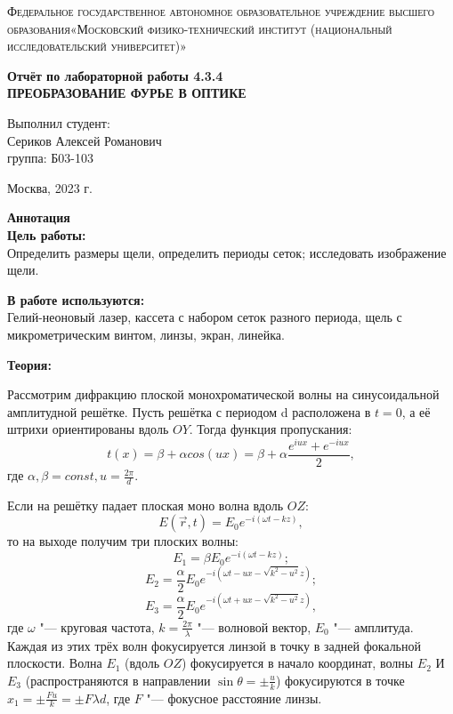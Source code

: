 \documentclass[a4paper, 12pt]{article}%
\begin{document}
	\begin{titlepage}
		\begin{center}
			\textsc{Федеральное государственное автономное образовательное учреждение высшего образования«Московский физико-технический институт (национальный исследовательский университет)»\\[5mm]
			}
			
			\vfill
			
			\textbf{Отчёт по лабораторной работы 4.3.4 \\[3mm]
				ПРЕОБРАЗОВАНИЕ ФУРЬЕ В ОПТИКЕ
				\\[50mm]
			}
			
		\end{center}
		
		\hfill
		\begin{minipage}{.5\textwidth}
			Выполнил студент:\\[2mm]
			Сериков Алексей Романович\\[2mm]
			группа: Б03-103\\[5mm]
			
		\end{minipage}
		\vfill
		\begin{center}
			Москва, 2023 г.
		\end{center}
		
	\end{titlepage}
	
	\newpage
	\textbf{Аннотация}\\
	
	
	\textbf{Цель работы: }\\
	
	Определить размеры щели, определить периоды сеток; исследовать изображение щели.
	
	
	\textbf{В работе используются: }\\
	
	Гелий-неоновый лазер, кассета с набором сеток разного периода, щель с микрометрическим винтом, линзы, экран, линейка.
	
	
		\textbf{Теория:}
	
	Рассмотрим дифракцию плоской монохроматической волны на синусоидальной амплитудной решётке. Пусть решётка с периодом d расположена в $t = 0$, а её штрихи ориентированы вдоль $OY$. Тогда функция пропускания:
	\[
	t(x) = \beta  + \alpha cos(ux) = \beta + \alpha \frac{e^{iux} + e^{-iux}}{2},
	\]
	где $\alpha, \beta = const, u = \frac{2 \pi}{d}$.
	
	Если на решётку падает плоская моно волна вдоль $OZ$:
	\[
	E(\vec r, t) = E_0 e^{-i(\omega t - kz)},
	\]
	то на выходе получим три плоских волны:
	\[
	E_1 = \beta E_0 e^{-i (\omega t - kz)};
	\]
	\[
	E_2 = \frac{\alpha}{2} E_0 e^{-i (\omega t - ux - \sqrt{k^2 - u^2}z)};
	\]
	\[
	E_3 = \frac{\alpha}{2} E_0 e^{-i (\omega t + ux - \sqrt{k^2 - u^2}z)},
	\]
	где $\omega$ "--- круговая частота, $k = \frac{2 \pi}{\lambda}$ "--- волновой вектор, $E_0$ "--- амплитуда.
	Каждая из этих трёх волн фокусируется линзой в точку в задней фокальной плоскости. Волна $E_1$ (вдоль $OZ$) фокусируется в начало координат, волны $E_2$ И $E_3$ (распространяются в направлении $\sin \theta = \pm \frac{u}{k}$) фокусируются в точке $x_1 = \pm \frac{Fu}{k} = \pm {F \lambda}{d}$, где $F$ "--- фокусное расстояние линзы.
	
\end{document}
